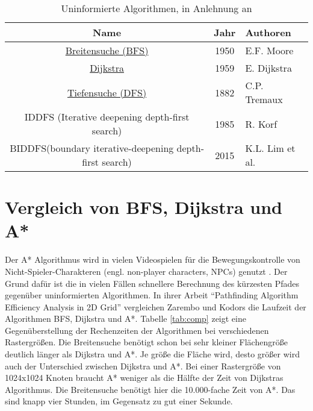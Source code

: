 \begin{table}[H]
	\begin{tabularx}{\linewidth}{|c|c|X|}
		\hline
		\textbf{Name}                                                    & \textbf{Jahr} & \textbf{Authoren}        \\ \hline
		\hyperref[sec:bfs]{Breitensuche (BFS)}                                      & 1950 & E.F. Moore      \\ \hline
		\hyperref[sec:dijkstra]{Dijkstra}                                                & 1959 & E. Dijkstra     \\ \hline
		\hyperref[sec:dfs]{Tiefensuche (DFS)}                                       & 1882 & C.P. Tremaux    \\ \hline
		IDDFS (Iterative deepening depth-first search)          & 1985 & R. Korf         \\ \hline
		BIDDFS(boundary iterative-deepening depth-first search) & 2015 & K.L. Lim et al. \\ \hline
	\end{tabularx}
\caption{\label{tab:uninformed}Uninformierte Algorithmen, in Anlehnung an \cite[S. 233]{Noo15}}
\end{table}

\section{Vergleich von BFS, Dijkstra und A*}

Der A* Algorithmus wird in vielen Videospielen für die Bewegungskontrolle von Nicht-Spieler-Charakteren (engl. non-player characters, NPCs) genutzt \cite{Stamford.2014}. Der Grund dafür ist die in vielen Fällen schnellere Berechnung des kürzesten Pfades gegenüber uninformierten Algorithmen. In ihrer Arbeit ``Pathfinding Algorithm Efficiency Analysis in 2D Grid'' vergleichen Zarembo und Kodors die Laufzeit der Algorithmen BFS, Dijkstra und A*. Tabelle \ref{tab:comp} zeigt eine Gegenüberstellung der Rechenzeiten der Algorithmen bei verschiedenen Rastergrößen. Die Breitensuche benötigt schon bei sehr kleiner Flächengröße deutlich länger als Dijkstra und A*. Je größe die Fläche wird, desto größer wird auch der Unterschied zwischen Dijkstra und A*. Bei einer Rastergröße von 1024x1024 Knoten braucht A* weniger als die Hälfte der Zeit von Dijkstras Algorithmus. Die Breitensuche benötigt hier die 10.000-fache Zeit von A*. Das sind knapp vier Stunden, im Gegensatz zu gut einer Sekunde.

